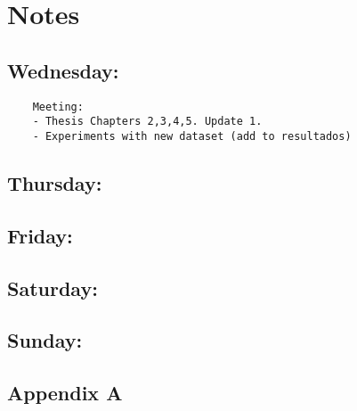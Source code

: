 \documentclass[12pt,oneside]{book}
\begin{document}
  \section*{Notes}
  \setlength\parindent{0pt}

  \subsection*{Wednesday:}

  \begin{lstlisting}
    Meeting:
    - Thesis Chapters 2,3,4,5. Update 1.
    - Experiments with new dataset (add to resultados)
  \end{lstlisting}

  \subsection*{Thursday:}

  \subsection*{Friday:}

  \subsection*{Saturday:}

  \subsection*{Sunday:}

\subsection*{Appendix A}
\end{document}
